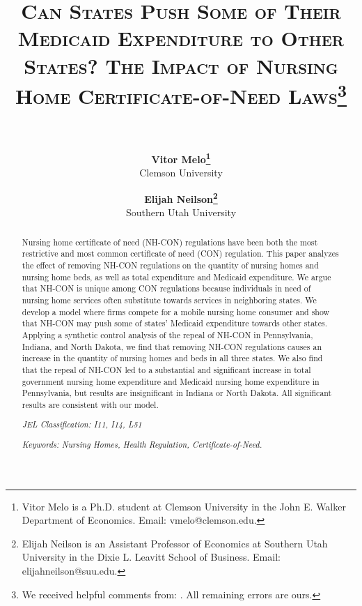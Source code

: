 \documentclass[12pt]{article}
\begin{document}

\title{\textsc{Can States Push Some of Their Medicaid Expenditure to Other States? The Impact of Nursing Home Certificate-of-Need Laws}\thanks{We received helpful comments from: . All remaining errors are ours.}\\
	$~$\\}

\medskip

\author{\textbf{Vitor Melo\protect\thanks{Vitor Melo is a Ph.D. student at Clemson University in the John E. Walker Department of Economics. Email: vmelo@clemson.edu.}} \\ Clemson University
\and
\textbf{Elijah Neilson\protect\thanks{Elijah Neilson is an Assistant Professor of Economics at Southern Utah University in the Dixie L. Leavitt School of Business. Email: elijahneilson@suu.edu.}} \\ Southern Utah University
  	}		

\date{}              %


\renewcommand{\thefootnote}{\fnsymbol{footnote}}

\singlespacing

\maketitle

\begin{abstract}
\noindent Nursing home certificate of need (NH-CON) regulations have been both the most restrictive and most common certificate of need (CON) regulation. This paper analyzes the effect of removing NH-CON regulations on the quantity of nursing homes and nursing home beds, as well as total expenditure and Medicaid expenditure. We argue that NH-CON is unique among CON regulations because individuals in need of nursing home services often substitute towards services in neighboring states. We develop a model where firms compete for a mobile nursing home consumer and show that NH-CON may push some of states’ Medicaid expenditure towards other states. Applying a synthetic control analysis of the repeal of NH-CON in Pennsylvania, Indiana, and North Dakota, we find that removing NH-CON regulations causes an increase in the quantity of nursing homes and beds in all three states. We also find that the repeal of NH-CON led to a substantial and significant increase in total government nursing home expenditure and Medicaid nursing home expenditure in Pennsylvania, but results are insignificant in Indiana or North Dakota. All significant results are consistent with our model.  



\bigskip
			
			\noindent\emph{JEL Classification: I11, I14, L51} 
			
			\bigskip
			
			\noindent\emph{Keywords: Nursing Homes, Health  Regulation, Certificate-of-Need. } 
\end{abstract}
\end{document}
